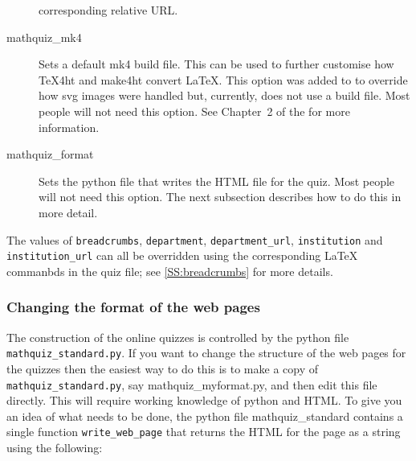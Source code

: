 \documentclass[svgnames]{article}
\begin{document}
\begin{description}
          corresponding relative URL.
        \item[mathquiz\_mk4]
          Sets a default \textsf{mk4 build file}. This can be used to further
          customise how \TeX4ht and \textsf{make4ht} convert \LaTeX.
          This option was added to \MathQuiz to override how svg images
          were handled but, currently, \MathQuiz does not use a  build
          file. Most people will not need this option. See Chapter~2 of
          the  for more information.
        \item[mathquiz\_format]
          Sets the python file that writes the HTML file for the quiz.
          Most people will not need this option. The next subsection
          describes how to do this in more detail.
    \end{description}

    The values of \Verb|breadcrumbs|, \Verb|department|, \Verb|department_url|,
    \Verb|institution| and \Verb|institution_url| can all be overridden
    using the corresponding  \LaTeX{} commanbds in the quiz file; see
    \autoref{SS:breadcrumbs} for more details.


  \subsubsection{Changing the format of the \MathQuiz web pages}
  The construction of the online quizzes is controlled by the python
  file \verb!mathquiz_standard.py!. If you want to change the structure
  of the web pages for the quizzes then the easiest way to do this is to make a
  copy of \verb!mathquiz_standard.py!, say \textsf{mathquiz\_myformat.py}, and
  then edit this file directly. This will require working knowledge of
  python and HTML. To give you an idea of what needs to be done,
  the python file \textsf{mathquiz\_standard} contains a single
  function \texttt{write\_web\_page} that returns the HTML for the page
  as a string using the following:
\end{document}
